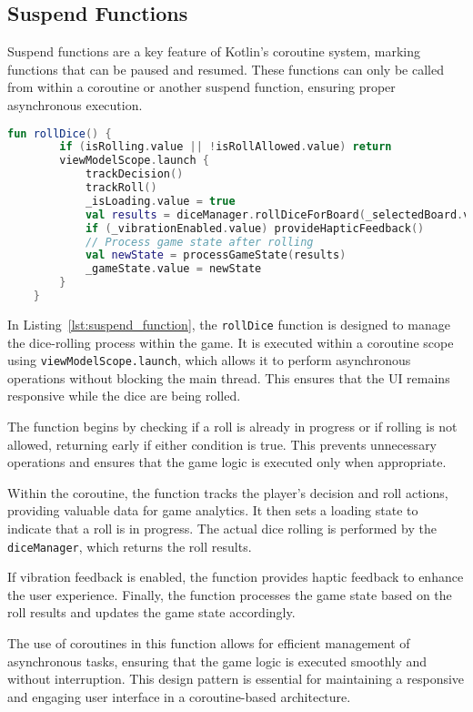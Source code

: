 \subsection{Suspend Functions}

Suspend functions are a key feature of Kotlin's coroutine system, marking functions that can be paused and resumed. These functions can only be called from within a coroutine or another suspend function, ensuring proper asynchronous execution.
\begin{lstlisting}[language=Kotlin, caption={Suspend Function Example}, label=lst:suspend_function]
    fun rollDice() {
        if (isRolling.value || !isRollAllowed.value) return
        viewModelScope.launch {
            trackDecision()
            trackRoll()
            _isLoading.value = true
            val results = diceManager.rollDiceForBoard(_selectedBoard.value)
            if (_vibrationEnabled.value) provideHapticFeedback()
            // Process game state after rolling
            val newState = processGameState(results)
            _gameState.value = newState
        }
    }
\end{lstlisting}

In Listing~\ref{lst:suspend_function}, the \texttt{rollDice} function is designed to manage the dice-rolling process within the game. It is executed within a coroutine scope using \texttt{viewModelScope.launch}, which allows it to perform asynchronous operations without blocking the main thread. This ensures that the UI remains responsive while the dice are being rolled.

The function begins by checking if a roll is already in progress or if rolling is not allowed, returning early if either condition is true. This prevents unnecessary operations and ensures that the game logic is executed only when appropriate.

Within the coroutine, the function tracks the player's decision and roll actions, providing valuable data for game analytics. It then sets a loading state to indicate that a roll is in progress. The actual dice rolling is performed by the \texttt{diceManager}, which returns the roll results.

If vibration feedback is enabled, the function provides haptic feedback to enhance the user experience. Finally, the function processes the game state based on the roll results and updates the game state accordingly.

The use of coroutines in this function allows for efficient management of asynchronous tasks, ensuring that the game logic is executed smoothly and without interruption. This design pattern is essential for maintaining a responsive and engaging user interface in a coroutine-based architecture.

